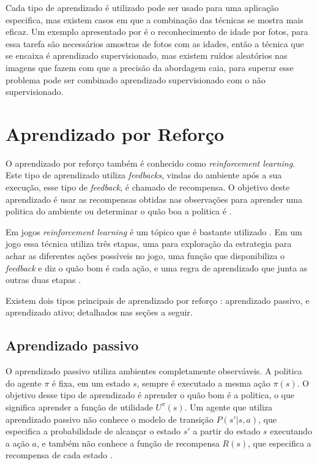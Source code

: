 Cada tipo de aprendizado é utilizado pode ser usado para uma aplicação especifica, mas existem casos em que a combinação das técnicas se mostra mais eficaz. 
Um exemplo apresentado por \cite{intelligence2003modern} é o reconhecimento de idade por fotos, para essa tarefa são necessários amostras de fotos com as idades, então a técnica que se encaixa é aprendizado supervisionado, mas existem ruídos aleatórios nas imagens que fazem com que a precisão da abordagem caia, para superar esse problema pode ser combinado aprendizado supervisionado com o não supervisionado.

\section{Aprendizado por Reforço}

O aprendizado por reforço também é conhecido como \textit{reinforcement learning}. Este tipo de aprendizado utiliza \textit{feedbacks}, vindas do ambiente após a sua execução, esse tipo de \textit{feedback}, é chamado de recompensa. O objetivo deste aprendizado é usar as recompensas obtidas nas observações para aprender uma politica do ambiente ou determinar o quão boa a politica é \cite{intelligence2003modern}. 

Em jogos \textit{reinforcement learning} é um tópico que é bastante utilizado \cite{millington2009artificial}. Em um jogo essa técnica utiliza três etapas, uma para exploração da estrategia para achar as diferentes ações possíveis no jogo, uma função que disponibiliza o \textit{feedback} e diz o quão bom é cada ação, e uma regra de aprendizado que junta as outras duas etapas \cite{millington2009artificial}.

Existem dois tipos principais de aprendizado por reforço \cite{intelligence2003modern}: aprendizado passivo, e aprendizado ativo; detalhados nas seções a seguir. 

\subsection{Aprendizado passivo} 

O aprendizado passivo utiliza ambientes completamente observáveis. A politica do agente $\pi$ é fixa, em um estado $s$, sempre é executado a mesma ação $\pi(s)$. O objetivo desse tipo de aprendizado é aprender o quão bom é a politica, o que significa aprender a função de utilidade $U^{\pi}(s)$. Um agente que utiliza aprendizado passivo não conhece o modelo de transição $P(s' | s, a)$, que especifica a probabilidade de alcançar o estado $s'$ a partir do estado $s$ executando a ação $a$, e também não conhece a função de recompensa $R(s)$, que especifica a recompensa de cada estado \cite{intelligence2003modern}. 

